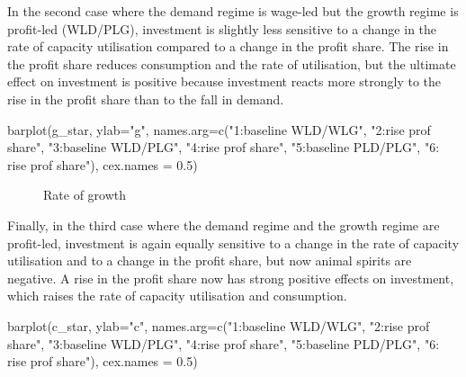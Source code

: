 \documentclass[
  letterpaper,
  DIV=11,
  numbers=noendperiod]{scrreprt}
\newenvironment{Shaded}{\begin{snugshade}}{\end{snugshade}}
\newcommand{\AttributeTok}[1]{\textcolor[rgb]{0.40,0.45,0.13}{#1}}
\newcommand{\FloatTok}[1]{\textcolor[rgb]{0.68,0.00,0.00}{#1}}
\newcommand{\FunctionTok}[1]{\textcolor[rgb]{0.28,0.35,0.67}{#1}}
\newcommand{\NormalTok}[1]{\textcolor[rgb]{0.00,0.23,0.31}{#1}}
\newcommand{\StringTok}[1]{\textcolor[rgb]{0.13,0.47,0.30}{#1}}
\begin{document}
In the second case where the demand regime is wage-led but the growth
regime is profit-led (WLD/PLG), investment is slightly less sensitive to
a change in the rate of capacity utilisation compared to a change in the
profit share. The rise in the profit share reduces consumption and the
rate of utilisation, but the ultimate effect on investment is positive
because investment reacts more strongly to the rise in the profit share
than to the fall in demand.

\begin{Shaded}
\begin{Highlighting}[]
\FunctionTok{barplot}\NormalTok{(g\_star, }\AttributeTok{ylab=}\StringTok{"g"}\NormalTok{, }\AttributeTok{names.arg=}\FunctionTok{c}\NormalTok{(}\StringTok{"1:baseline WLD/WLG"}\NormalTok{, }\StringTok{"2:rise prof share"}\NormalTok{, }\StringTok{"3:baseline WLD/PLG"}\NormalTok{,}
                                      \StringTok{"4:rise prof share"}\NormalTok{, }
                                      \StringTok{"5:baseline PLD/PLG"}\NormalTok{, }\StringTok{"6: rise prof share"}\NormalTok{), }\AttributeTok{cex.names =} \FloatTok{0.5}\NormalTok{)}
\end{Highlighting}
\end{Shaded}

\begin{figure}[H]


\caption{\label{fig-growth-pkdg}Rate of growth}

\end{figure}%

Finally, in the third case where the demand regime and the growth regime
are profit-led, investment is again equally sensitive to a change in the
rate of capacity utilisation and to a change in the profit share, but
now animal spirits are negative. A rise in the profit share now has
strong positive effects on investment, which raises the rate of capacity
utilisation and consumption.

\begin{Shaded}
\begin{Highlighting}[]
\FunctionTok{barplot}\NormalTok{(c\_star, }\AttributeTok{ylab=}\StringTok{"c"}\NormalTok{, }\AttributeTok{names.arg=}\FunctionTok{c}\NormalTok{(}\StringTok{"1:baseline WLD/WLG"}\NormalTok{, }\StringTok{"2:rise prof share"}\NormalTok{, }\StringTok{"3:baseline WLD/PLG"}\NormalTok{,}
                                      \StringTok{"4:rise prof share"}\NormalTok{, }
                                      \StringTok{"5:baseline PLD/PLG"}\NormalTok{, }\StringTok{"6: rise prof share"}\NormalTok{), }\AttributeTok{cex.names =} \FloatTok{0.5}\NormalTok{)}
\end{Highlighting}
\end{Shaded}
\end{document}
